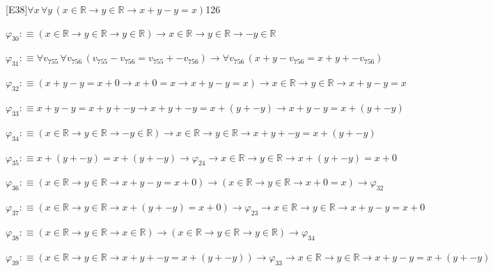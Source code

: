 \begin{fullproof}{[E38]}{$\forall x\,\forall y\,(x \in \mathbb{R} \to y \in \mathbb{R} \to x + y - y = x)$}{126}
\begin{abbrevlist}
\item $\varphi_{30} :\equiv (x \in \mathbb{R} \to y \in \mathbb{R} \to y \in \mathbb{R}) \to x \in \mathbb{R} \to y \in \mathbb{R} \to -y \in \mathbb{R}$
\item $\varphi_{31} :\equiv \forall v_{755}\,\forall v_{756}\,(v_{755} - v_{756} = v_{755} + -v_{756}) \to \forall v_{756}\,(x + y - v_{756} = x + y + -v_{756})$
\item $\varphi_{32} :\equiv (x + y - y = x + 0 \to x + 0 = x \to x + y - y = x) \to x \in \mathbb{R} \to y \in \mathbb{R} \to x + y - y = x$
\item $\varphi_{33} :\equiv x + y - y = x + y + -y \to x + y + -y = x + (y + -y) \to x + y - y = x + (y + -y)$
\item $\varphi_{34} :\equiv (x \in \mathbb{R} \to y \in \mathbb{R} \to -y \in \mathbb{R}) \to x \in \mathbb{R} \to y \in \mathbb{R} \to x + y + -y = x + (y + -y)$
\item $\varphi_{35} :\equiv x + (y + -y) = x + (y + -y) \to \varphi_{24} \to x \in \mathbb{R} \to y \in \mathbb{R} \to x + (y + -y) = x + 0$
\item $\varphi_{36} :\equiv (x \in \mathbb{R} \to y \in \mathbb{R} \to x + y - y = x + 0) \to (x \in \mathbb{R} \to y \in \mathbb{R} \to x + 0 = x) \to \varphi_{32}$
\item $\varphi_{37} :\equiv (x \in \mathbb{R} \to y \in \mathbb{R} \to x + (y + -y) = x + 0) \to \varphi_{23} \to x \in \mathbb{R} \to y \in \mathbb{R} \to x + y - y = x + 0$
\item $\varphi_{38} :\equiv (x \in \mathbb{R} \to y \in \mathbb{R} \to x \in \mathbb{R}) \to (x \in \mathbb{R} \to y \in \mathbb{R} \to y \in \mathbb{R}) \to \varphi_{34}$
\item $\varphi_{39} :\equiv (x \in \mathbb{R} \to y \in \mathbb{R} \to x + y + -y = x + (y + -y)) \to \varphi_{33} \to x \in \mathbb{R} \to y \in \mathbb{R} \to x + y - y = x + (y + -y)$
\end{abbrevlist}
\end{fullproof}
